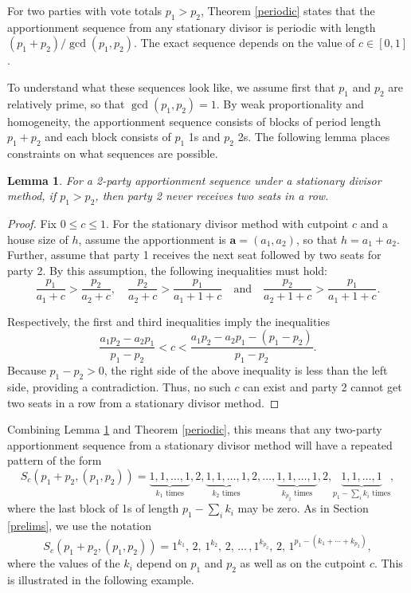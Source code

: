 \documentclass[pdflatex,sn-mathphys-num]{sn-jnl}
\theoremstyle{thmstyleone}%
\newtheorem{lemma}{Lemma}
\theoremstyle{thmstyletwo}%
\theoremstyle{thmstylethree}%
\begin{document}
For two parties with vote totals  $p_1>p_2$, Theorem \ref{periodic} states that the apportionment sequence from any stationary divisor is periodic with length $(p_1+p_2)/\gcd(p_1, p_2)$.  The exact sequence depends on the value of $c \in [0, 1]$.  

To understand what these sequences look like,  we assume first that  $p_1$ and $p_2$ are relatively prime, so that $\gcd(p_1,p_2) = 1$.  By weak proportionality and homogeneity, the apportionment sequence consists of blocks of period length $p_1 + p_2$ and each block consists of $p_1$ 1s and $p_2$ 2s.  The following lemma places constraints on what sequences are possible.


\begin{lemma} \label{two-in-a-row} For a 2-party apportionment sequence under a stationary divisor method, if $p_1>p_2$, then party 2 never receives two seats in a row. \end{lemma}

\begin{proof} Fix $0 \leq c \leq 1$. For the stationary divisor method with cutpoint $c$ and a house size of $h$, assume the apportionment is $\mathbf a = (a_1,a_2)$, so that $h = a_1 + a_2$.  Further, assume that party 1 receives the next seat followed by two seats for party 2.  By this assumption, the following inequalities must hold:
\begin{equation*} \frac{p_1}{a_1+c} > \frac{p_2}{a_2+c}, \quad   \frac{p_2}{a_2+c} > \frac{p_1}{a_1 +1 +c} \quad \mbox{and} \quad \frac{p_2}{a_2+1+c} > \frac{p_1}{a_1+1+c}.\end{equation*}

Respectively, the first and third inequalities imply the inequalities
\begin{equation*} 
\frac{a_1p_2 - a_2p_1}{p_1-p_2} < c < \frac{a_1p_2-a_2p_1 - (p_1 - p_2)}{p_1-p_2}.
\end{equation*}
Because $p_1 - p_2 > 0$, the right side of the above inequality is less than the left side, providing a contradiction. Thus, no such $c$ can exist and party 2 cannot get two seats in a row from a stationary divisor method.\end{proof}

Combining Lemma \ref{two-in-a-row} and Theorem \ref{periodic}, this means that any two-party apportionment sequence from a stationary divisor method will have a repeated pattern of the form 
$$S_c(p_1+p_2,(p_1, p_2))=\underbrace{1, 1, \ldots, 1}_{k_1 \text{ times}}, 2, \underbrace{1, 1, \ldots, 1}_{k_2 \text{ times}}, 2, \ldots, \underbrace{1, 1, \ldots, 1}_{k_{p_2} \text{ times}}, 2, \underbrace{1, 1, \ldots, 1}_{p_1- \sum_i k_i \text{ times}},$$
where the last block of 1s of length $p_1- \sum_i k_i$ may be zero.  As in Section \ref{prelims}, we use the notation 
 $$S_c(p_1+p_2, (p_1, p_2)) = 1^{k_1}, \, 2, \, 1^{k_2}, \, 2,  \, \ldots \, , 1^{k_{p_2}}, \, 2, \, 1^{p_1-(k_1+ \cdots + k_{p_2})},$$
\noindent where the values of the $k_i$ depend on $p_1$ and $p_2$ as well as on the cutpoint $c$. This is  illustrated in the following example.
\end{document}
